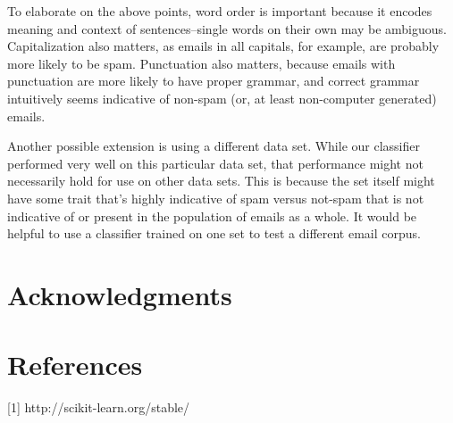 \documentclass{article} %
\begin{document}
To elaborate on the above points, word order is important because it encodes meaning and context of sentences--single words on their own may be ambiguous. Capitalization also matters, as emails in all capitals, for example, are probably more likely to be spam. Punctuation also matters, because emails with punctuation are more likely to have proper grammar, and correct grammar intuitively seems indicative of non-spam (or, at least non-computer generated) emails. 

Another possible extension is using a different data set. While our classifier performed very well on this particular data set, that performance might not necessarily hold for use on other data sets. This is because the set itself might have some trait that's highly indicative of spam versus not-spam that is not indicative of or present in the population of emails as a whole. It would be helpful to use a classifier trained on one set to test a different email corpus. 

\section{Acknowledgments}

\section{References}

[1] http://scikit-learn.org/stable/
\end{document}
